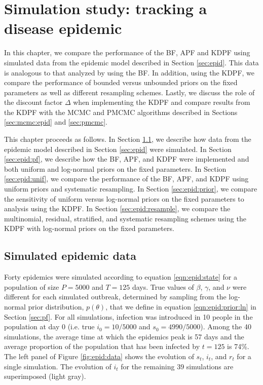 \chapter{Simulation study: tracking a disease epidemic} \label{ch:epid}

In this chapter, we compare the performance of the BF, APF and KDPF using simulated data from the epidemic model described in Section \ref{sec:epid}. This data is analogous to that analyzed by \citet{skvortsov2012monitoring} using the BF. In addition, using the KDPF, we compare the performance of bounded versus unbounded priors on the fixed parameters as well as different resampling schemes. Lastly, we discuss the role of the discount factor $\Delta$ when implementing the KDPF and compare results from the KDPF with the MCMC and PMCMC algorithms described in Sections \ref{sec:mcmc:epid} and \ref{sec:pmcmc}.

This chapter proceeds as follows. In Section \ref{sec:epid:sim}, we describe how data from the epidemic model described in Section \ref{sec:epid} were simulated. In Section \ref{sec:epid:pf}, we describe how the BF, APF, and KDPF were implemented and both uniform and log-normal priors on the fixed parameters. In Section \ref{sec:epid:unif}, we compare the performance of the BF, APF, and KDPF using uniform priors and systematic resampling. In Section \ref{sec:epid:prior}, we compare the sensitivity of uniform versus log-normal priors on the fixed parameters to analysis using the KDPF. In Section \ref{sec:epid:resample}, we compare the multinomial, residual, stratified, and systematic resampling schemes using the KDPF with log-normal priors on the fixed parameters.

\section{Simulated epidemic data} \label{sec:epid:sim}

Forty epidemics were simulated according to equation \eqref{eqn:epid:state} for a population of size $P = 5000$ and $T = 125$ days. True values of $\beta$, $\gamma$, and $\nu$ were different for each simulated outbreak, determined by sampling from the log-normal prior distribution, $p(\theta)$, that we define in equation \eqref{eqn:epid:prior:ln} in Section \ref{sec:pf}. For all simulations, infection was introduced in 10 people in the population at day 0 (i.e. true $i_0 = 10/5000$ and $s_0 = 4990/5000$). Among the 40 simulations, the average time at which the epidemics peak is 57 days and the average proportion of the population that has been infected by $t = 125$ is 74\%. The left panel of Figure \ref{fig:epid:data} shows the evolution of $s_t$, $i_t$, and $r_t$ for a single simulation. The evolution of $i_t$ for the remaining 39 simulations are superimposed (light gray).

